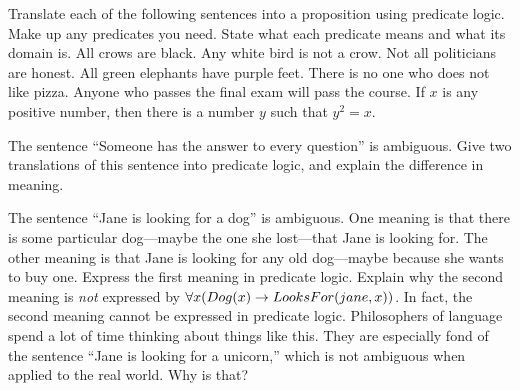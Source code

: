 \begin{exercises}
\problem Translate each of the following sentences into a proposition 
using predicate logic.  Make up any predicates you need.  State what
each predicate means and what its domain is.
\ppart All crows are black.
\ppart Any white bird is not a crow.
\ppart Not all politicians are honest.
\ppart All green elephants have purple feet.
\ppart There is no one who does not like pizza.
\ppart Anyone who passes the final exam will pass the course.
\ppart If $x$ is any positive number, then there is a number $y$ such that
$y^2=x$.

\problem The sentence ``Someone has the answer to every question'' is
ambiguous.  Give two translations of this sentence into predicate logic,
and explain the difference in meaning.

\problem The sentence ``Jane is looking for a dog'' is ambiguous.
One meaning is that there is some particular dog---maybe the one she lost---that
Jane is looking for.  The other meaning is that Jane is looking for any old
dog---maybe because she wants to buy one.  Express the first meaning in
predicate logic.  Explain why the second meaning is \emph{not}
expressed by $\forall x(Dog(x)\rightarrow LooksFor(jane,x))$.  In fact, the
second meaning cannot be expressed in predicate logic.  Philosophers
of language spend a lot of time thinking about things like this.
They are especially fond of the sentence ``Jane is looking for a unicorn,''
which is not ambiguous when applied to the real world.  Why is that?



\end{exercises}





